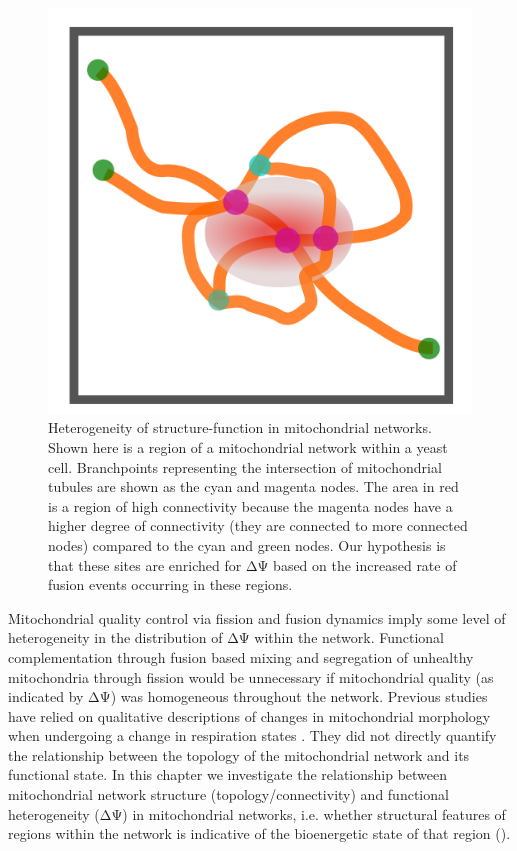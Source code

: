 \begin{figure}[htp]
	\centering
    \includegraphics[width=.5\textwidth]{cartoon}
    \caption[Heterogeneity of structure-function in mitochondrial networks]{Heterogeneity of structure-function in mitochondrial networks.\\Shown here is a region of a mitochondrial network within a yeast cell. Branchpoints representing the intersection of mitochondrial tubules are shown as the cyan and magenta nodes. The area in red is a region of high connectivity because the magenta nodes have a higher degree of connectivity (they are connected to more connected nodes) compared to the cyan and green nodes. Our hypothesis is that these sites are enriched for ΔΨ based on the increased rate of fusion events occurring in these regions.}\label{fig:cartoon}
\end{figure}
%

Mitochondrial quality control via fission and fusion dynamics imply some level of heterogeneity in the distribution of ΔΨ within the network. Functional complementation through fusion based mixing and segregation of unhealthy mitochondria through fission would be unnecessary if mitochondrial quality (as indicated by ΔΨ) was homogeneous throughout the network. Previous studies have relied on qualitative descriptions of changes in mitochondrial morphology when undergoing a change in respiration states \cite{jakobs_spatial_2003,sesaki_division_1999}. They did not directly quantify the relationship between the topology of the mitochondrial network and its functional state. In this chapter we investigate the relationship between mitochondrial network structure (topology/connectivity) and functional heterogeneity (ΔΨ) in mitochondrial networks, i.e. whether structural features of regions within the network is indicative of the bioenergetic state of that region (). 

